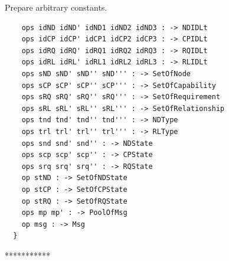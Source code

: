 \documentclass[12pt]{report}
\begin{document}
 Prepare arbitrary constants.
\small
\begin{verbatim}
    ops idND idND' idND1 idND2 idND3 : -> NDIDLt
    ops idCP idCP' idCP1 idCP2 idCP3 : -> CPIDLt
    ops idRQ idRQ' idRQ1 idRQ2 idRQ3 : -> RQIDLt
    ops idRL idRL' idRL1 idRL2 idRL3 : -> RLIDLt
    ops sND sND' sND'' sND''' : -> SetOfNode
    ops sCP sCP' sCP'' sCP''' : -> SetOfCapability
    ops sRQ sRQ' sRQ'' sRQ''' : -> SetOfRequirement
    ops sRL sRL' sRL'' sRL''' : -> SetOfRelationship
    ops tnd tnd' tnd'' tnd''' : -> NDType
    ops trl trl' trl'' trl''' : -> RLType
    ops snd snd' snd'' : -> NDState
    ops scp scp' scp'' : -> CPState
    ops srq srq' srq'' : -> RQState
    op stND : -> SetOfNDState
    op stCP : -> SetOfCPState
    op stRQ : -> SetOfRQState
    ops mp mp' : -> PoolOfMsg
    op msg : -> Msg
  }
\end{verbatim}
\normalsize
***********

\end{document}

